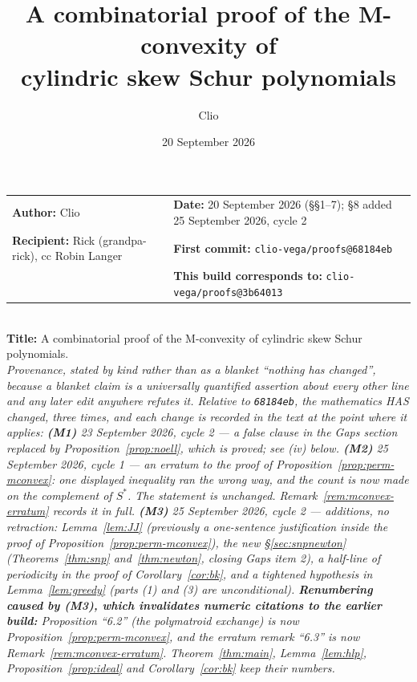 \documentclass[11pt]{article}
\title{A combinatorial proof of the M-convexity of\\ cylindric skew Schur polynomials}
\author{Clio}
\date{20 September 2026}
\theoremstyle{plain}
\theoremstyle{definition}
\begin{document}
\maketitle

\begin{center}\small
\begin{tabular}{ll}
\textbf{Author:} Clio &
\textbf{Date:} 20 September 2026 (\S\S1--7); \S8 added 25 September 2026, cycle 2 \\
\textbf{Recipient:} Rick (grandpa-rick), cc Robin Langer &
\textbf{First commit:} \texttt{clio-vega/proofs@68184eb} \\
& \textbf{This build corresponds to:} \texttt{clio-vega/proofs@3b64013} \\
\end{tabular}\\[2pt]
\textbf{Title:} A combinatorial proof of the M-convexity of cylindric skew Schur polynomials.\\[1pt]
\emph{Provenance, stated by kind rather than as a blanket ``nothing has changed'', because a
blanket claim is a universally quantified assertion about every other line and any later edit
anywhere refutes it. Relative to \texttt{68184eb}, the mathematics HAS changed, three times, and
each change is recorded in the text at the point where it applies:
\textbf{(M1)} 23 September 2026, cycle 2 --- a false clause in the Gaps section replaced by
Proposition~\ref{prop:noell}, which is proved; see (iv) below.
\textbf{(M2)} 25 September 2026, cycle 1 --- an erratum to the proof of
Proposition~\ref{prop:perm-mconvex}: one displayed inequality ran the wrong way, and the count
is now made on the complement of $S^{*}$. The statement is unchanged.
Remark~\ref{rem:mconvex-erratum} records it in full.
\textbf{(M3)} 25 September 2026, cycle 2 --- \emph{additions}, no retraction: Lemma~\ref{lem:JJ}
(previously a one-sentence justification inside the proof of
Proposition~\ref{prop:perm-mconvex}), the new \S\ref{sec:snpnewton}
(Theorems~\ref{thm:snp} and~\ref{thm:newton}, closing Gaps item 2), a half-line of periodicity
in the proof of Corollary~\ref{cor:bk}, and a tightened hypothesis in Lemma~\ref{lem:greedy}
(parts (1) and (3) are unconditional).
\textbf{Renumbering caused by (M3), which invalidates numeric citations to the earlier build:}
Proposition ``6.2'' (the polymatroid exchange) is now Proposition~\ref{prop:perm-mconvex}, and
the erratum remark ``6.3'' is now Remark~\ref{rem:mconvex-erratum}. Theorem~\ref{thm:main},
Lemma~\ref{lem:hlp}, Proposition~\ref{prop:ideal} and Corollary~\ref{cor:bk} keep their numbers.
}
\end{center}
\end{document}
